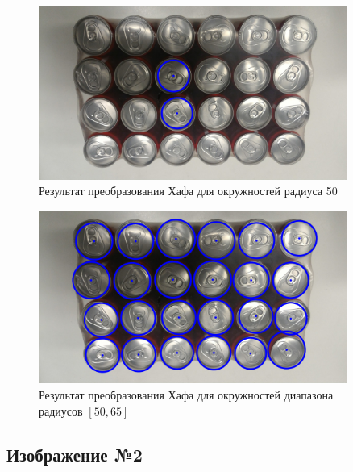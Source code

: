 \begin{figure}[H]
    \centering
    \includegraphics[width=0.9\textwidth]{../outputs/image6_canny_r50.png}
    \caption{Результат преобразования Хафа для окружностей радиуса 50}
\end{figure}


\begin{figure}[H]
    \centering
    \includegraphics[width=0.9\textwidth]{../outputs/image6_canny_r5065.png}
    \caption{Результат преобразования Хафа для окружностей диапазона радиусов $[50, 65]$}
\end{figure}

\subsection{Изображение №2}


